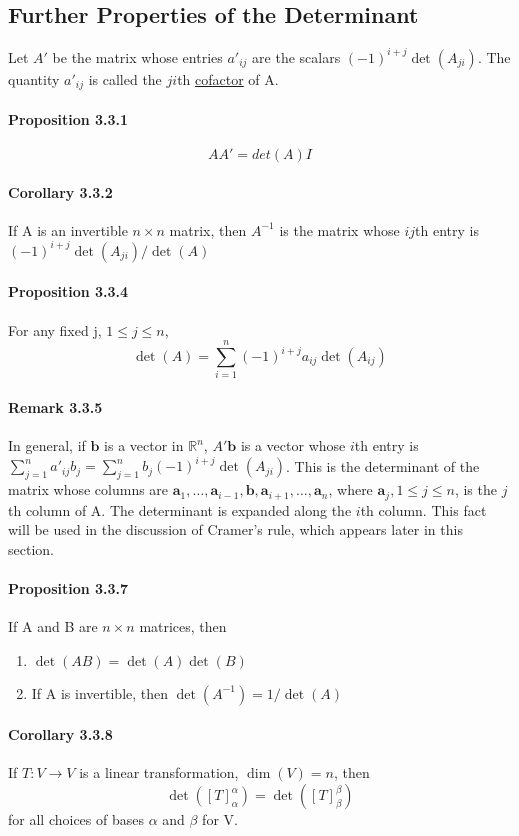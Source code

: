 \documentclass[11pt]{article}
\newcommand{\tb}[1]{\textbf{#1}}
\newcommand{\under}[1]{\underline{#1}}
\newcommand{\real}[0]{\mathbb{R}}
\newcommand{\va}[0]{\tb{a}}
\newcommand{\vb}[0]{\tb{b}}
\begin{document}
{\subsection{Further Properties of the Determinant}
Let $A'$ be the matrix whose entries $a'_{ij}$ are the scalars $(-1)^{i+j}\det(A_{ji})$. The quantity $a'_{ij}$ is called the $ji$th \under{cofactor} of A.
\paragraph{Proposition 3.3.1} $$AA' = det(A)I$$
\paragraph{Corollary 3.3.2} If A is an invertible $n \times n$ matrix, then $A^{-1}$ is the matrix whose $ij$th entry is $(-1)^{i+j}\det(A_{ji})/\det(A)$
\paragraph{Proposition 3.3.4} For any fixed j, $1 \leq j \leq n$,
$$\det(A) = \sum_{i=1}^n(-1)^{i+j}a_{ij}\det(A_{ij})$$
\paragraph{Remark 3.3.5} In general, if $\vb$ is a vector in $\real^n$, $A'\vb$ is a vector whose $i$th entry is $\sum_{j=1}^n a'_{ij}b_j=\sum_{j=1}^nb_j(-1)^{i+j}\det(A_{ji})$. This is the determinant of the matrix whose columns are $\va_1,\hdots,\va_{i-1},\vb,\va_{i+1},\hdots,\va_n$, where $\va_j, 1\leq j\leq n$, is the $j$th column of A. The determinant is expanded along the $i$th column. This fact will be used in the discussion of Cramer's rule, which appears later in this section.
\paragraph{Proposition 3.3.7}If A and B are $n \times n$ matrices, then
\begin{enumerate}
	\item $\det(AB) = \det(A)\det(B)$
	\item If A is invertible, then $\det(A^{-1}) = 1/\det(A)$
\end{enumerate}
\paragraph{Corollary 3.3.8} If $T: V \rightarrow V$ is a linear transformation, $\dim(V) = n$, then $$\det([T]_\alpha^\alpha) = \det([T]_\beta^\beta)$$ for all choices of bases $\alpha$ and $\beta$ for V.
}
\end{document}
